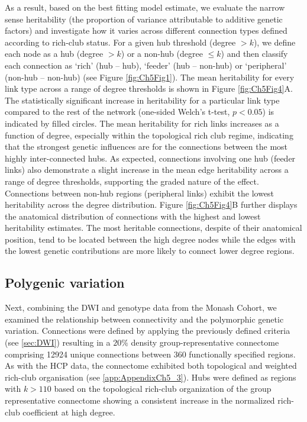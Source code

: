 As a result, based on the best fitting model estimate, we evaluate the narrow sense heritability (the proportion of variance attributable to additive genetic factors) and investigate how it varies across different connection types defined according to rich-club status. For a given hub threshold (degree $> k$), we define each node as a hub (degree $> k$) or a non-hub (degree $\leq k$) and then classify each connection as `rich' (hub – hub), `feeder' (hub – non-hub) or `peripheral' (non-hub – non-hub) (see Figure \ref{fig:Ch5Fig1}). The mean heritability for every link type across a range of degree thresholds is shown in Figure \ref{fig:Ch5Fig4}A. The statistically significant increase in heritability for a particular link type compared to the rest of the network (one-sided Welch’s t-test, $p < 0.05$) is indicated by filled circles. The mean heritability for rich links increases as a function of degree, especially within the topological rich club regime, indicating that the strongest genetic influences are for the connections between the most highly inter-connected hubs. As expected, connections involving one hub (feeder links) also demonstrate a slight increase in the mean edge heritability across a range of degree thresholds, supporting the graded nature of the effect. Connections between non-hub regions (peripheral links) exhibit the lowest heritability across the degree distribution. Figure \ref{fig:Ch5Fig4}B further displays the anatomical distribution of connections with the highest and lowest heritability estimates. The most heritable connections, despite of their anatomical position, tend to be located between the high degree nodes while the edges with the lowest genetic contributions are more likely to connect lower degree regions.

\subsection{Polygenic variation}

Next, combining the DWI and genotype data from the Monash Cohort, we examined the relationship between connectivity and the polymorphic genetic variation. Connections were defined by applying the previously defined criteria (see \ref{sec:DWI}) resulting in a $20\%$ density group-representative connectome comprising \num{12924} unique connections between 360 functionally specified regions. As with the HCP data, the connectome exhibited both topological and weighted rich-club organisation (see \ref{app:AppendixCh5_3}). Hubs were defined as regions with $k > 110$ based on the topological rich-club organization of the group representative connectome showing a consistent increase in the normalized rich-club coefficient at high degree.

